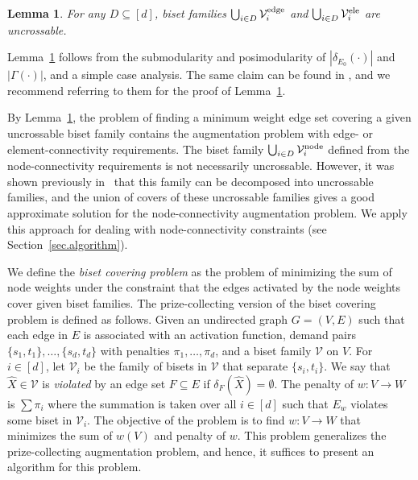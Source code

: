 \documentclass[11pt]{article}
\newtheorem{lemma}{Lemma}
\newcommand{\Vfam}{\mathcal{V}}
\begin{document}
\begin{lemma}\label{lem.edge-element}
For any $D\subseteq [d]$,
biset families
$\bigcup_{i \in D}\Vfam^{\rm edge}_i$ and
$\bigcup_{i \in D}\Vfam^{\rm ele}_i$
are uncrossable.
\end{lemma}

Lemma~\ref{lem.edge-element} follows from the submodularity and
posimodularity of $|\delta_{E_0}(\cdot)|$ and $|\Gamma(\cdot)|$, and a simple case analysis.
The same claim can be found in
\cite{FleischerJW06,Nutov12uncrossable}, and we recommend referring to
them for the proof of Lemma~\ref{lem.edge-element}.


By Lemma~\ref{lem.edge-element},
the problem of finding a minimum weight edge set covering 
a given uncrossable biset family
contains the augmentation problem with edge- or element-connectivity
requirements. The biset family
$\bigcup_{i \in D}\Vfam^{\rm node}_i$
defined from the node-connectivity requirements is not
necessarily uncrossable. However, it was shown previously in~\cite{ChuzhoyK12,Nutov12uncrossable,Nutov12subset}
that this family can be decomposed into uncrossable families, and the union of
covers of these uncrossable families gives a good approximate solution
for the node-connectivity augmentation problem.
We apply this approach for dealing with node-connectivity constraints
(see Section~\ref{sec.algorithm}).

We define the {\em biset covering problem}
as 
the problem of 
minimizing the sum of node weights under the constraint that the edges
activated by the node weights cover given biset families.
The prize-collecting version of the biset covering problem
is defined as follows.
Given an undirected graph $G=(V,E)$ such that each edge in $E$ is
associated with an activation function, 
demand pairs
$\{s_1,t_1\},\ldots,\{s_d,t_d\}$ with penalties
$\pi_1,\ldots,\pi_d$,
and a biset family $\Vfam$ on $V$.
For $i \in [d]$, let $\Vfam_i$ be the family of bisets in $\Vfam$
that separate $\{s_i,t_i\}$.
We say that $\hat{X} \in \Vfam$ is {\em violated} by an edge set $F\subseteq E$
if $\delta_F(\hat{X})=\emptyset$.
The penalty of $w\colon V \rightarrow W$ is $\sum \pi_i$ where the summation is
taken over all $i \in [d]$ such that $E_w$ violates some biset in $\Vfam_i$.
The objective of the problem is to find $w\colon V \rightarrow W$ that minimizes 
the sum of $w(V)$ and penalty of $w$.
This problem generalizes
the prize-collecting augmentation problem,
and hence, it suffices to present an algorithm for this problem.
\end{document}
